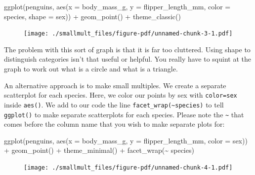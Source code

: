 \documentclass[
  letterpaper,
  DIV=11,
  numbers=noendperiod]{scrreprt}
\newenvironment{Shaded}{\begin{snugshade}}{\end{snugshade}}
\newcommand{\AttributeTok}[1]{\textcolor[rgb]{0.40,0.45,0.13}{#1}}
\newcommand{\FunctionTok}[1]{\textcolor[rgb]{0.28,0.35,0.67}{#1}}
\newcommand{\NormalTok}[1]{\textcolor[rgb]{0.00,0.23,0.31}{#1}}
\newcommand{\SpecialCharTok}[1]{\textcolor[rgb]{0.37,0.37,0.37}{#1}}
\begin{document}
\begin{Shaded}
\begin{Highlighting}[]
\FunctionTok{ggplot}\NormalTok{(penguins, }\FunctionTok{aes}\NormalTok{(}\AttributeTok{x =}\NormalTok{ body\_mass\_g,  }\AttributeTok{y =}\NormalTok{ flipper\_length\_mm, }
                     \AttributeTok{color =}\NormalTok{ species, }\AttributeTok{shape =}\NormalTok{ sex)) }\SpecialCharTok{+} 
  \FunctionTok{geom\_point}\NormalTok{() }\SpecialCharTok{+}
  \FunctionTok{theme\_classic}\NormalTok{()}
\end{Highlighting}
\end{Shaded}

\begin{figure}[H]

{\centering \texttt{[image: ./smallmult\_files/figure-pdf/unnamed-chunk-3-1.pdf]}

}

\end{figure}

The problem with this sort of graph is that it is far too cluttered.
Using shape to distinguish categories isn't that useful or helpful. You
really have to squint at the graph to work out what is a circle and what
is a triangle.

An alternative approach is to make small multiples. We create a separate
scatterplot for each species. Here, we color our points by sex with
\texttt{color=sex} inside \texttt{aes()}. We add to our code the line
\texttt{facet\_wrap(\textasciitilde{}species)} to tell \texttt{ggplot()}
to make separate scatterplots for each species. Please note the
\texttt{\textasciitilde{}} that comes before the column name that you
wish to make separate plots for:

\begin{Shaded}
\begin{Highlighting}[]
\FunctionTok{ggplot}\NormalTok{(penguins, }\FunctionTok{aes}\NormalTok{(}\AttributeTok{x =}\NormalTok{ body\_mass\_g,  }\AttributeTok{y =}\NormalTok{ flipper\_length\_mm, }\AttributeTok{color =}\NormalTok{ sex)) }\SpecialCharTok{+} 
  \FunctionTok{geom\_point}\NormalTok{() }\SpecialCharTok{+}
  \FunctionTok{theme\_minimal}\NormalTok{() }\SpecialCharTok{+}
  \FunctionTok{facet\_wrap}\NormalTok{(}\SpecialCharTok{\textasciitilde{}}\NormalTok{ species)}
\end{Highlighting}
\end{Shaded}

\begin{figure}[H]

{\centering \texttt{[image: ./smallmult\_files/figure-pdf/unnamed-chunk-4-1.pdf]}

}

\end{figure}
\end{document}
